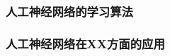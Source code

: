 \documentclass[12pt,a4paper,UTF8]{ctexart}
\begin{document}
\subsubsection{人工神经网络的学习算法}

\subsubsection{人工神经网络在XX方面的应用}












\end{document}
